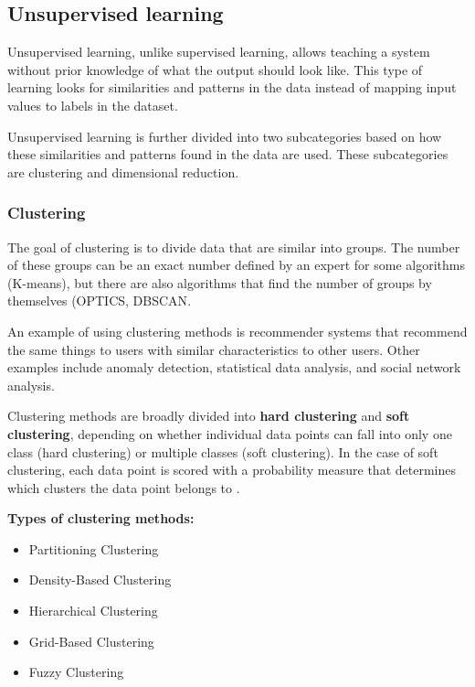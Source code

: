 \subsection{Unsupervised learning}
Unsupervised learning, unlike supervised learning, allows teaching a system without prior knowledge of what the output should look like. This type of learning looks for similarities and patterns in the data instead of mapping input values to labels in the dataset.\cite{coursera-ml}

Unsupervised learning is further divided into two subcategories based on how these similarities and patterns found in the data are used. These subcategories are clustering and dimensional reduction.

\subsubsection{Clustering}


The goal of clustering is to divide data that are similar into groups\cite{ml-types2}. The number of these groups can be an exact number defined by an expert for some algorithms (K-means\cite{k-means}), but there are also algorithms that find the number of groups by themselves (OPTICS\cite{optics}, DBSCAN\cite{dbscan}.

An example of using clustering methods is recommender systems that recommend the same things to users with similar characteristics to other users. Other examples include anomaly detection, statistical data analysis, and social network analysis\cite{clustering-applications}.

Clustering methods are broadly divided into \textbf{hard clustering} and \textbf{soft clustering}, depending on whether individual data points can fall into only one class (hard clustering) or multiple classes (soft clustering). In the case of soft clustering, each data point is scored with a probability measure that determines which clusters the data point belongs to \cite{clustering-types}. 

\textbf{Types of clustering methods:}
\begin{itemize}
    \item Partitioning Clustering
    \item Density-Based Clustering
    \item Hierarchical Clustering
    \item Grid-Based Clustering
    \item Fuzzy Clustering
\end{itemize}

